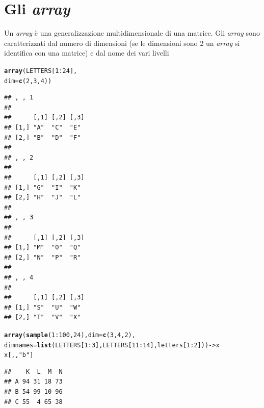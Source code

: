 \documentclass[onecolumn,12pt]{book}\usepackage[]{graphicx}\usepackage[]{color}
\makeatletter
\newcommand{\hlnum}[1]{\textcolor[rgb]{0.686,0.059,0.569}{#1}}%
\newcommand{\hlstr}[1]{\textcolor[rgb]{0.192,0.494,0.8}{#1}}%
\newcommand{\hlopt}[1]{\textcolor[rgb]{0,0,0}{#1}}%
\newcommand{\hlstd}[1]{\textcolor[rgb]{0.345,0.345,0.345}{#1}}%
\newcommand{\hlkwb}[1]{\textcolor[rgb]{0.69,0.353,0.396}{#1}}%
\newcommand{\hlkwc}[1]{\textcolor[rgb]{0.333,0.667,0.333}{#1}}%
\newcommand{\hlkwd}[1]{\textcolor[rgb]{0.737,0.353,0.396}{\textbf{#1}}}%
\newenvironment{kframe}{%
 \def\at@end@of@kframe{}%
 \ifinner\ifhmode%
  \def\at@end@of@kframe{\end{minipage}}%
  \begin{minipage}{\columnwidth}%
 \fi\fi%
 \def\FrameCommand##1{\hskip\@totalleftmargin \hskip-\fboxsep
 \colorbox{shadecolor}{##1}\hskip-\fboxsep
     \hskip-\linewidth \hskip-\@totalleftmargin \hskip\columnwidth}%
 \MakeFramed {\advance\hsize-\width
   \@totalleftmargin\z@ \linewidth\hsize
   \@setminipage}}%
 {\par\unskip\endMakeFramed%
 \at@end@of@kframe}
\newenvironment{knitrout}{}{} %
\makeatother
\begin{document}
\section{Gli \emph{array}}
Un \emph{array}  \`e una generalizzazione multidimensionale di una matrice. Gli \emph{array} sono caratterizzati dal numero di dimensioni  (se le dimensioni sono 2 un \emph{array} si identifica con una  matrice) e dal nome dei vari livelli
\begin{knitrout}
\color{fgcolor}\begin{kframe}
\begin{alltt}
\hlkwd{array}\hlstd{(LETTERS[}\hlnum{1}\hlopt{:}\hlnum{24}\hlstd{],}
\hlkwc{dim}\hlstd{=}\hlkwd{c}\hlstd{(}\hlnum{2}\hlstd{,}\hlnum{3}\hlstd{,}\hlnum{4}\hlstd{))}
\end{alltt}
\begin{verbatim}
## , , 1
## 
##      [,1] [,2] [,3]
## [1,] "A"  "C"  "E" 
## [2,] "B"  "D"  "F" 
## 
## , , 2
## 
##      [,1] [,2] [,3]
## [1,] "G"  "I"  "K" 
## [2,] "H"  "J"  "L" 
## 
## , , 3
## 
##      [,1] [,2] [,3]
## [1,] "M"  "O"  "Q" 
## [2,] "N"  "P"  "R" 
## 
## , , 4
## 
##      [,1] [,2] [,3]
## [1,] "S"  "U"  "W" 
## [2,] "T"  "V"  "X"
\end{verbatim}
\begin{alltt}
\hlkwd{array}\hlstd{(}\hlkwd{sample}\hlstd{(}\hlnum{1}\hlopt{:}\hlnum{100}\hlstd{,}\hlnum{24}\hlstd{),} \hlkwc{dim}\hlstd{=}\hlkwd{c}\hlstd{(}\hlnum{3}\hlstd{,}\hlnum{4}\hlstd{,}\hlnum{2}\hlstd{),}
      \hlkwc{dimnames}\hlstd{=}\hlkwd{list}\hlstd{(LETTERS[}\hlnum{1}\hlopt{:}\hlnum{3}\hlstd{],LETTERS[}\hlnum{11}\hlopt{:}\hlnum{14}\hlstd{],letters[}\hlnum{1}\hlopt{:}\hlnum{2}\hlstd{]))}\hlkwb{->}\hlstd{x}
\hlstd{x[,,}\hlstr{"b"}\hlstd{]}
\end{alltt}
\begin{verbatim}
##    K  L  M  N
## A 94 31 18 73
## B 54 99 10 96
## C 55  4 65 38
\end{verbatim}
\end{kframe}
\end{knitrout}
\end{document}

